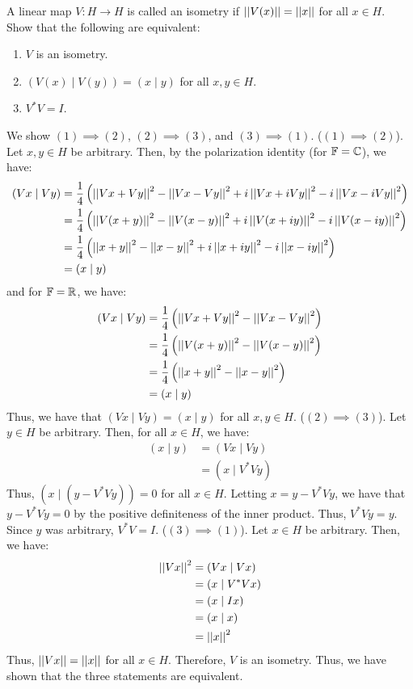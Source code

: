 \documentclass[12pt]{article}
\begin{document}
\begin{problem}{66}
    A linear map $V: H \to H$ is called an isometry if $\left\vert\left\vert V(x)\right\vert\right\vert = \left\vert\left\vert x\right\vert\right\vert$ for all $x \in H$. Show that the following are equivalent:
    \begin{enumerate}
        \item $V$ is an isometry.
        \item $(V(x) \mid V(y)) = (x \mid y)$ for all $x, y \in H$.
        \item $V^*V = I$.
    \end{enumerate}
\end{problem}
\begin{solution}
    We show $(1) \implies (2)$, $(2) \implies (3)$, and $(3) \implies (1)$. \bbni
    ($(1) \implies (2)$). Let $x, y \in H$ be arbitrary. Then, by the polarization identity (for $\mathbb F = \mathbb C$), we have:
    \begin{align*}
        (Vx \mid Vy) &= \frac{1}{4}\left(\left\vert\left\vert Vx+Vy\right\vert\right\vert^2 - \left\vert\left\vert Vx-Vy\right\vert\right\vert^2 + i\left\vert\left\vert Vx+iVy\right\vert\right\vert^2 - i\left\vert\left\vert Vx-iVy\right\vert\right\vert^2\right) \\
        &= \frac{1}{4}\left(\left\vert\left\vert V(x+y)\right\vert\right\vert^2 - \left\vert\left\vert V(x-y)\right\vert\right\vert^2 + i\left\vert\left\vert V(x+iy)\right\vert\right\vert^2 - i\left\vert\left\vert V(x-iy)\right\vert\right\vert^2\right) \\
        &= \frac{1}{4}\left(\left\vert\left\vert x+y\right\vert\right\vert^2 - \left\vert\left\vert x-y\right\vert\right\vert^2 + i\left\vert\left\vert x+iy\right\vert\right\vert^2 - i\left\vert\left\vert x-iy\right\vert\right\vert^2\right) \\
        &= (x \mid y) 
    \end{align*}
    and for $\mathbb F = \mathbb R$, we have:
    \begin{align*}
        (Vx \mid Vy) &= \frac{1}{4}\left(\left\vert\left\vert Vx+Vy\right\vert\right\vert^2 - \left\vert\left\vert Vx-Vy\right\vert\right\vert^2\right) \\
        &=  \frac{1}{4}\left(\left\vert\left\vert V(x+y)\right\vert\right\vert^2 - \left\vert\left\vert V(x-y)\right\vert\right\vert^2\right) \\
        &= \frac{1}{4}\left(\left\vert\left\vert x+y\right\vert\right\vert^2 - \left\vert\left\vert x-y\right\vert\right\vert^2\right) \\
        &= (x \mid y)
    \end{align*}
    Thus, we have that $(Vx \mid Vy) = (x \mid y)$ for all $x, y \in H$. \bbni
    ($(2) \implies (3)$). Let $y \in H$ be arbitrary. Then, for all $x \in H$, we have:
    \begin{align*}
       (x \mid y) &= (Vx \mid Vy) \\
       &= (x \mid V^*Vy) 
    \end{align*}
    Thus, $(x \mid (y-V^*Vy)) = 0$ for all $x \in H$. Letting $x = y - V^*Vy$, we have that $y - V^*Vy = 0$ by the positive definiteness of the inner product. Thus, $V^*Vy = y$. Since $y$ was arbitrary, $V^*V = I$. \bbni
    ($(3) \implies (1)$). Let $x \in H$ be arbitrary. Then, we have:
    \begin{align*}
        \left\vert\left\vert Vx\right\vert\right\vert^2 &= (Vx \mid Vx) \\
        &= (x \mid V^*Vx) \\
        &= (x \mid Ix) \\
        &= (x \mid x) \\
        &= \left\vert\left\vert x\right\vert\right\vert^2
    \end{align*}
    Thus, $\left\vert\left\vert Vx\right\vert\right\vert = \left\vert\left\vert x\right\vert\right\vert$ for all $x \in H$. Therefore, $V$ is an isometry. \bbni
    Thus, we have shown that the three statements are equivalent.
\end{solution}
\newpage
\end{document}
